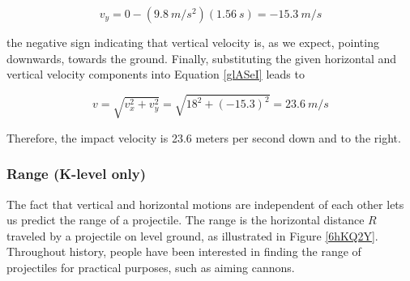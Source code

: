 \documentclass[main-physics.tex]{subfiles}
\begin{document}
\begin{equation*}
    v_y = 0 - (\SI{9.8}{m/s^2})(\SI{1.56}{s}) = -\SI{15.3}{m/s} 
\end{equation*}

the negative sign indicating that vertical velocity is, as we expect, pointing downwards, towards the ground. Finally, substituting the given horizontal and vertical velocity components into Equation \eqref{glASeI} leads to

\begin{equation*}
    v = \sqrt{v_x^2 + v_y^2} = \sqrt{18^2 + \left(-15.3\right)^2} = \SI{23.6}{m/s}
\end{equation*}

Therefore, the impact velocity is 23.6 meters per second down and to the right.

\begin{center}
\end{center}

\endsolution


\subsubsection*{Range (K-level only)}

The fact that vertical and horizontal motions are independent of each other lets us predict the range of a projectile. The \gls{range} is the horizontal distance $R$ traveled by a projectile on level ground, as illustrated in Figure \ref{6hKQ2Y}. Throughout history, people have been interested in finding the range of projectiles for practical purposes, such as aiming cannons.
\end{document}
